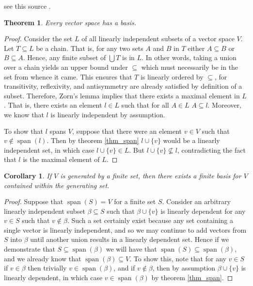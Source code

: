 \documentclass[oneside, 12pt]{book}
\DeclareMathOperator{\spn}{span}
\newtheorem{thm}{Theorem}[section]
\newtheorem{cor}{Corollary}[section]
\theoremstyle{definition}
\begin{document}
see this source \textcite{jechset}.
\begin{thm}
\label{thm_basis}
Every vector space has a basis.
\end{thm}
\begin{proof}
  Consider the set $L$ of all linearly independent subsets of a vector space $V$. Let $T \subseteq L$ be a chain. That is, for any two sets $A$ and $B$ in $T$ either $A \subseteq B$ or $B \subseteq A$. Hence, any finite subset of $\bigcup T$ is in $L$. In other words, taking a union over a chain yields an upper bound under $\subseteq$ which must necessarily be in the set from whence it came. This ensures that $T$ is linearly ordered by $\subseteq$, for transitivity, reflexivity, and antisymmetry are already satisfied by definition of a subset. Therefore, Zorn's lemma implies that there exists a maximal element in $L$. That is, there exists an element $l \in L$ such that for all $A \in L$ $A \subseteq l$. Moreover, we know that $l$ is linearly independent by assumption.

  To show that $l$ spans $V$, suppose that there were an element $v \in V$ such that $v\notin \spn(l)$. Then by theorem \ref{thm_span} $l \cup \{v\}$ would be a linearly independent set, in which case $l \cup \{v\} \in L $. But $l \cup \{v \} \nsubseteq l$, contradicting the fact that $l$ is the maximal element of $L$.
\end{proof}
\begin{cor}
\label{cor_bascard}
If $V$ is generated by a finite set, then there exists a finite basis for $V$ contained within the generating set.
\end{cor}
\begin{proof}
  Suppose that $\spn(S)=V$ for a finite set $S$. Consider an arbitrary linearly independent subset $\beta \subseteq S$ such that $\beta \cup \{v\}$ is linearly dependent for any $v \in S$ such that $v \notin \beta$. Such a set certainly exist because any set containing a single vector is linearly independent, and so we may continue to add vectors from $S$ into $\beta$ until another union results in a linearly dependent set. Hence if we demonstrate that $S \subseteq \spn(\beta)$ we will have that $\spn(S)\subseteq \spn(\beta)$, and we already know that $\spn(\beta)\subseteq V$. To show this, note that for any $v \in S$ if $v \in \beta$ then trivially $v \in \spn(\beta)$, and if $v \notin \beta$, then by assumption $\beta \cup \{v\}$ is linearly dependent, in which case $v \in \spn(\beta)$ by theorem \ref{thm_span}.
\end{proof}
\end{document}
